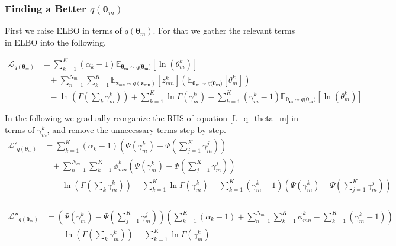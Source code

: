 \documentclass[a4]{article}
\begin{document}
\subsubsection{Finding a Better $q(\bm{\theta}_m)$}
First we raise ELBO in terms of $q(\bm{\theta}_m)$.
For that we gather the relevant terms in ELBO into the following.

\begin{equation}
\begin{aligned}
    \mathcal{L}_{q(\bm{\theta}_m)}
    &= \sum_{k=1}^{K} (\alpha_k - 1)
       \mathbb{E}_{\bm{\theta_m} \sim q(\bm{\theta_m)}}[\ln(\theta_m^k)]\\
    &\:\:\:\:+
    \sum_{n=1}^{N_m} \sum_{k=1}^{K} 
        \mathbb{E}_{\mathbf{z}_{mn} \sim q(\mathbf{z_{mn}})} [z_{mn}^{k}] 
        \left(
            \mathbb{E}_{\bm{\theta_m} \sim q(\bm{\theta_m)}} [\theta_m^k] 
        \right)\\
    &\:\:\:\:
      - \ln \left( \Gamma( \sum_k \gamma_{m}^k ) \right) 
      + \sum_{k=1}^{K} \ln \Gamma(\gamma_{m}^k) 
      - \sum_{k=1}^{K} (\gamma_{m}^k - 1)
        \mathbb{E}_{\bm{\theta_m} \sim q(\bm{\theta_m)}}[\ln(\theta_m^k)]\label{L_q_theta_m}\\
\\
\end{aligned}
\end{equation}
In the following we gradually reorganize the RHS of equation \ref{L_q_theta_m} in terms of $\gamma_m^k$,
and remove the unnecessary terms step by step.
\begin{equation}
\begin{aligned}
    \mathcal{L}'_{q(\bm{\theta}_m)}
    &= \sum_{k=1}^{K}
           \left(\alpha_k - 1 \right)
           \left(
               \Psi( \gamma_{m}^k ) - \Psi( \sum_{j=1}^{K} \gamma_{m}^j )
           \right)\\
    &\:\:\:\:+
    \sum_{n=1}^{N_m} \sum_{k=1}^{K} 
        \phi_{mn}^{k}
        \left(
            \Psi( \gamma_{m}^k ) - \Psi( \sum_{j=1}^{K} \gamma_{m}^j )
        \right)\\
    &\:\:\:\:
      - \ln \left( \Gamma( \sum_k \gamma_{m}^k ) \right) 
      + \sum_{k=1}^{K} \ln \Gamma(\gamma_{m}^k) 
      - \sum_{k=1}^{K} (\gamma_{m}^k - 1)
        \left(
            \Psi( \gamma_{m}^k ) - \Psi( \sum_{j=1}^{K} \gamma_{m}^j )
        \right)\\
\end{aligned}
\end{equation}

\begin{equation}
\begin{aligned}
    \mathcal{L}''_{q(\bm{\theta}_m)}
    &=
        \left(
            \Psi( \gamma_{m}^k ) - \Psi( \sum_{j=1}^{K} \gamma_{m}^j )
        \right)
        \left(
             \sum_{k=1}^{K}\left(\alpha_k - 1 \right)
             + \sum_{n=1}^{N_m} \sum_{k=1}^{K}\phi_{mn}^{k}
             - \sum_{k=1}^{K} (\gamma_{m}^k - 1)
        \right)\\
    &\:\:\:\:
      - \ln \left( \Gamma( \sum_k \gamma_{m}^k ) \right) 
      + \sum_{k=1}^{K} \ln \Gamma(\gamma_{m}^k)\\
\end{aligned}
\end{equation}
\end{document}
